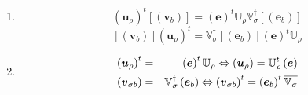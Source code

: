 \documentclass[aps,preprint]{revtex4}
\begin{document}
\begin{enumerate}
\begin{enumerate}
\item 
\begin{equation}
\left( \boldsymbol{u}_{\rho }\right) ^{t}\left[ \left( \boldsymbol{v}%
_{b}\right) \right] =\left( \boldsymbol{e}\right) ^{t}\mathbb{U}_{\rho }%
\mathbb{V}_{\sigma }^{\dagger }\left[ \left( \boldsymbol{e}_{b}\right) %
\right]
\end{equation}%
\begin{equation}
\left[ \left( \boldsymbol{v}_{b}\right) \right] \left( \boldsymbol{u}_{\rho
}\right) ^{t}=\mathbb{V}_{\sigma }^{\dagger }\left[ \left( \boldsymbol{e}%
_{b}\right) \right] \left( \boldsymbol{e}\right) ^{t}\mathbb{U}_{\rho }
\end{equation}

\item 
\begin{eqnarray}
\left( \boldsymbol{u}_{\rho }\right) ^{t} &=&\left( \boldsymbol{e}\right)
^{t}\mathbb{U}_{\rho }\Leftrightarrow \left( \boldsymbol{u}_{\rho }\right) =%
\mathbb{U}_{\rho }^{t}\left( \boldsymbol{e}\right) \\
\left( \boldsymbol{v}_{\sigma b}\right) &=&\mathbb{V}_{\sigma }^{\dagger
}\left( \boldsymbol{e}_{b}\right) \Leftrightarrow \left( \boldsymbol{v}%
_{\sigma b}\right) ^{t}=\left( \boldsymbol{e}_{b}\right) ^{t}\overline{%
\mathbb{V}_{\sigma }}
\end{eqnarray}


\end{enumerate}
\end{enumerate}
\end{document}
